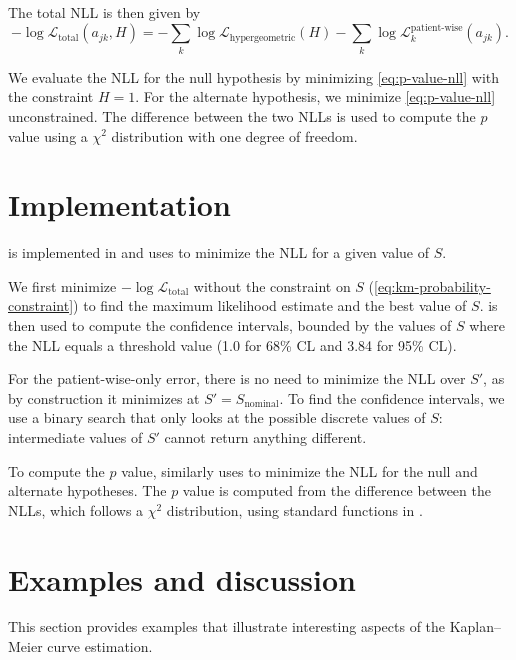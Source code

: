 \documentclass[article]{jss}
\newcommand{\KM}{Kaplan--Meier} %
\begin{document}
The total NLL is then given by
\begin{equation}
-\log \mathcal{L}_{\text{total}}(a_{jk}, H) = -\sum_{k}\log\mathcal{L}_\text{hypergeometric}(H) - \sum_{k}\log\mathcal{L}_k^{\text{patient-wise}}(a_{jk}).
\label{eq:p-value-nll}
\end{equation}

We evaluate the NLL for the null hypothesis by minimizing \cref{eq:p-value-nll} with the constraint \(H=1\).  For the alternate hypothesis, we minimize \cref{eq:p-value-nll} unconstrained.  The difference between the two NLLs is used to compute the \(p\) value using a \(\chi^2\) distribution with one degree of freedom.

\section{Implementation}

 is implemented in  and uses  \citep{gurobi} to minimize the NLL for a given value of \(S\).

We first minimize \(-\log \mathcal{L}_{\text{total}}\) without the constraint on \(S\) (\ref{eq:km-probability-constraint}) to find the maximum likelihood estimate and the best value of \(S\)\@.   \citep{brentq,scipy} is then used to compute the confidence intervals, bounded by the values of \(S\) where the NLL equals a threshold value (1.0 for 68\% CL and 3.84 for 95\% CL).

For the patient-wise-only error, there is no need to minimize the NLL over \(S'\), as by construction it minimizes at \(S'=S_\text{nominal}\).  To find the confidence intervals, we use a binary search that only looks at the possible discrete values of \(S\): intermediate values of \(S'\) cannot return anything different.

To compute the \(p\) value,  similarly uses  to minimize the NLL for the null and alternate hypotheses.  The \(p\) value is computed from the difference between the NLLs, which follows a \(\chi^2\) distribution, using standard functions in .

\section{Examples and discussion}

This section provides examples that illustrate interesting aspects of the \KM{} curve estimation.
\end{document}
